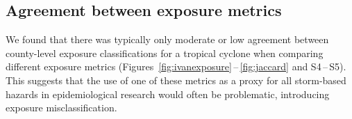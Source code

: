 \begin{comment}
However, these frequency maps, together with evidence from
specific tropical cyclones (Figures~\ref{fig:ivanexposure}
and~\ref{fig:jaccard}),  do illustrate the potential for strong differences in
spatial patterns in tropical cyclone exposures, depending on which tropical
cyclone hazards are considered.  A few previous studies have sought to
determine county-level exposure to tropical cyclones over multi-year periods,
including~\textcite{zandbergen2009}, which estimated exposure in \ac{US}
counties to all \ac{US} landfalling Atlantic-basin tropical cyclones
between~1851 and~2003, using both a distance-based metric and a metric that
combined distance and windspeed, and~\textcite{kruk2010}, which explored
exposure to hurricane-related winds in the \ac{US}, including inland areas,
for~1900\,--\,2008.  Our results suggest that such exposure assessments may
perform well in capturing some tropical cyclone hazards (e.g., wind), but
likely miss other potentially dangerous tropical cyclone exposures, especially
for hazards that repeatedly threaten northern or inland counties (e.g., rain,
flooding).
\end{comment}

\subsection*{Agreement between exposure metrics}

We found that there was typically only moderate or low agreement between
county-level exposure classifications for a tropical cyclone when comparing
different exposure metrics
(Figures~\ref{fig:ivanexposure}\,--\,\ref{fig:jaccard}  and S4\,--\,S5). This
suggests that the use of one of these metrics as a proxy for all storm-based
hazards in epidemiological research would often be problematic, introducing
exposure misclassification.

\begin{comment}
For example, distance from a tropical cyclone's track is relatively easy to
measure and has been used as an operational metric of exposure to tropical
cyclones in previous large-scale studies (examples include ...). Since distance
itself does not constitute a hazard, distance is meant in these cases as a
surrogate to capture exposure to hazards from the tropical cyclone. However,
here we found that in assessing \ac{US} county-level exposure to tropical
cyclones, distance is, at best, a moderate, and often a very poor, surrogate
for exposure to the specific tropical cyclone hazards of high wind, extreme
rainfall, flooding, and tornadoes (Figure~\ref{fig:jaccard}). Therefore, use of
distance to assess tropical cyclone exposure for impact studies could result in
problematic exposure misclassification, which could mask true associations,
even strong associations, between tropical cyclone exposure and outcomes of
interest in impact studies~\parencite{savitz2016interpreting,
armstrong1998effect}.  
\end{comment}

